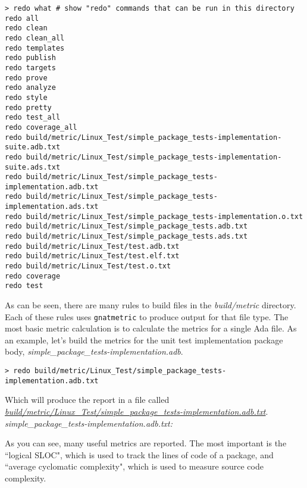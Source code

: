 \vspace{5mm} %
\begin{verbatim}
> redo what # show "redo" commands that can be run in this directory
redo all
redo clean
redo clean_all
redo templates
redo publish
redo targets
redo prove
redo analyze
redo style
redo pretty
redo test_all
redo coverage_all
redo build/metric/Linux_Test/simple_package_tests-implementation-suite.adb.txt
redo build/metric/Linux_Test/simple_package_tests-implementation-suite.ads.txt
redo build/metric/Linux_Test/simple_package_tests-implementation.adb.txt
redo build/metric/Linux_Test/simple_package_tests-implementation.ads.txt
redo build/metric/Linux_Test/simple_package_tests-implementation.o.txt
redo build/metric/Linux_Test/simple_package_tests.adb.txt
redo build/metric/Linux_Test/simple_package_tests.ads.txt
redo build/metric/Linux_Test/test.adb.txt
redo build/metric/Linux_Test/test.elf.txt
redo build/metric/Linux_Test/test.o.txt
redo coverage
redo test
\end{verbatim}
\vspace{5mm} %

As can be seen, there are many rules to build files in the \textit{build/metric} directory. Each of these rules uses \texttt{gnatmetric} to produce output for that file type. The most basic metric calculation is to calculate the metrics for a single Ada file. As an example, let's build the metrics for the unit test implementation package body, \textit{simple\_package\_tests-implementation.adb}.

\vspace{5mm} %
\begin{verbatim}
> redo build/metric/Linux_Test/simple_package_tests-implementation.adb.txt
\end{verbatim}
\vspace{5mm} %

Which will produce the report in a file called \textit{\url{build/metric/Linux\_Test/simple\_package\_tests-implementation.adb.txt}}. \\

\textit{simple\_package\_tests-implementation.adb.txt:}

As you can see, many useful metrics are reported. The most important is the ``logical SLOC", which is used to track the lines of code of a package, and ``average cyclomatic complexity", which is used to measure source code complexity. \\

